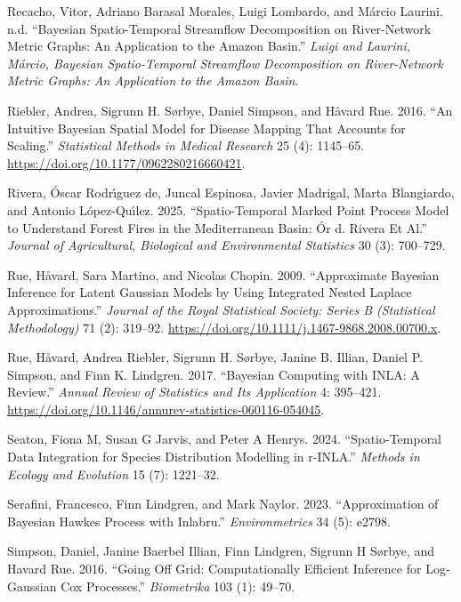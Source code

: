 \documentclass[
  letterpaper,
  DIV=11,
  numbers=noendperiod]{scrartcl}
\newlength{\cslhangindent}
\newenvironment{CSLReferences}[2] %
 {\begin{list}{}{%
  \setlength{\itemindent}{0pt}
  \setlength{\leftmargin}{0pt}
  \setlength{\parsep}{0pt}
  \ifodd #1
   \setlength{\leftmargin}{\cslhangindent}
   \setlength{\itemindent}{-1\cslhangindent}
  \fi
  \setlength{\itemsep}{#2\baselineskip}}}
 {\end{list}}
\begin{document}
\begin{CSLReferences}{1}{1}
Recacho, Vitor, Adriano Barasal Morales, Luigi Lombardo, and Márcio
Laurini. n.d. {``Bayesian Spatio-Temporal Streamflow Decomposition on
River-Network Metric Graphs: An Application to the Amazon Basin.''}
\emph{Luigi and Laurini, M{á}rcio, Bayesian Spatio-Temporal Streamflow
Decomposition on River-Network Metric Graphs: An Application to the
Amazon Basin}.

Riebler, Andrea, Sigrunn H. Sørbye, Daniel Simpson, and Håvard Rue.
2016. {``An Intuitive {Bayesian} Spatial Model for Disease Mapping That
Accounts for Scaling.''} \emph{Statistical Methods in Medical Research}
25 (4): 1145--65. \url{https://doi.org/10.1177/0962280216660421}.

Rivera, Óscar Rodrı́guez de, Juncal Espinosa, Javier Madrigal, Marta
Blangiardo, and Antonio López-Quı́lez. 2025. {``Spatio-Temporal Marked
Point Process Model to Understand Forest Fires in the Mediterranean
Basin: {Ó}r d. Rivera Et Al.''} \emph{Journal of Agricultural,
Biological and Environmental Statistics} 30 (3): 700--729.

Rue, Håvard, Sara Martino, and Nicolas Chopin. 2009. {``Approximate
{Bayesian} Inference for Latent {Gaussian} Models by Using Integrated
Nested {Laplace} Approximations.''} \emph{Journal of the Royal
Statistical Society: Series B (Statistical Methodology)} 71 (2):
319--92. \url{https://doi.org/10.1111/j.1467-9868.2008.00700.x}.

Rue, Håvard, Andrea Riebler, Sigrunn H. Sørbye, Janine B. Illian, Daniel
P. Simpson, and Finn K. Lindgren. 2017. {``Bayesian Computing with
{INLA}: A Review.''} \emph{Annual Review of Statistics and Its
Application} 4: 395--421.
\url{https://doi.org/10.1146/annurev-statistics-060116-054045}.

Seaton, Fiona M, Susan G Jarvis, and Peter A Henrys. 2024.
{``Spatio-Temporal Data Integration for Species Distribution Modelling
in r-INLA.''} \emph{Methods in Ecology and Evolution} 15 (7): 1221--32.

Serafini, Francesco, Finn Lindgren, and Mark Naylor. 2023.
{``Approximation of Bayesian Hawkes Process with Inlabru.''}
\emph{Environmetrics} 34 (5): e2798.

Simpson, Daniel, Janine Baerbel Illian, Finn Lindgren, Sigrunn H Sørbye,
and Havard Rue. 2016. {``Going Off Grid: Computationally Efficient
Inference for Log-Gaussian Cox Processes.''} \emph{Biometrika} 103 (1):
49--70.


\end{CSLReferences}
\end{document}
